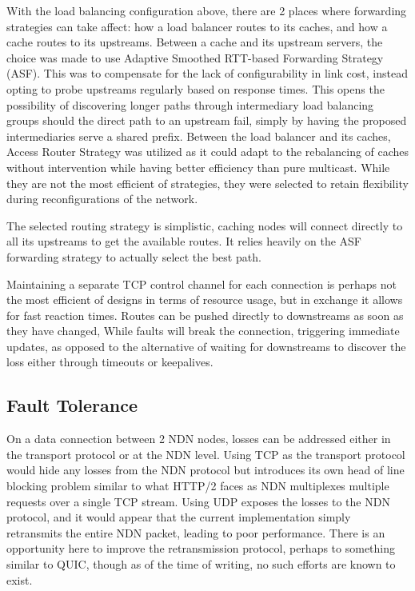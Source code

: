 \documentclass[conference]{IEEEtran}
\begin{document}
    With the load balancing configuration above,
    there are 2 places where forwarding strategies can take affect:
    how a load balancer routes to its caches, and how a cache routes to its upstreams.
    Between a cache and its upstream servers, the choice was made to use
    Adaptive Smoothed RTT-based Forwarding Strategy (ASF).
    This was to compensate for the lack of configurability in link cost,
    instead opting to probe upstreams regularly based on response times.
    This opens the possibility of discovering longer paths through intermediary
    load balancing groups should the direct path to an upstream fail,
    simply by having the proposed intermediaries serve a shared prefix.
    Between the load balancer and its caches,
    Access Router Strategy was utilized as it could adapt to the rebalancing of caches
    without intervention while having better efficiency than pure multicast.
    While they are not the most efficient of strategies,
    they were selected to retain flexibility during reconfigurations of the network.

    The selected routing strategy is simplistic,
    caching nodes will connect directly to all its upstreams to get the available routes.
    It relies heavily on the ASF forwarding strategy to actually select the best path.

    Maintaining a separate TCP control channel for each connection
    is perhaps not the most efficient of designs in terms of resource usage,
    but in exchange it allows for fast reaction times.
    Routes can be pushed directly to downstreams as soon as they have changed,
    While faults will break the connection, triggering immediate updates,
    as opposed to the alternative of waiting for downstreams to discover
    the loss either through timeouts or keepalives.

    \subsection*{Fault Tolerance}
    On a data connection between 2 NDN nodes,
    losses can be addressed either in the transport protocol or at the NDN level.
    Using TCP as the transport protocol would hide any losses from the NDN protocol
    but introduces its own head of line blocking problem similar to what HTTP/2
    faces as NDN multiplexes multiple requests over a single TCP stream.
    Using UDP exposes the losses to the NDN protocol,
    and it would appear that the current implementation
    simply retransmits the entire NDN packet, leading to poor performance.
    There is an opportunity here to improve the retransmission protocol,
    perhaps to something similar to QUIC,
    though as of the time of writing, no such efforts are known to exist.
\end{document}
